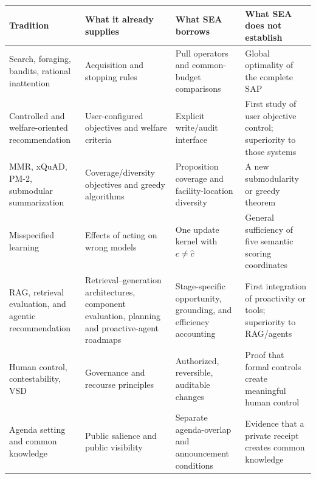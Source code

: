 \documentclass[
  11pt]{article}
\begin{document}
\begin{longtable}[]{@{}
  >{\raggedright\arraybackslash}p{}
  >{\raggedright\arraybackslash}p{}
  >{\raggedright\arraybackslash}p{}
  >{\raggedright\arraybackslash}p{}@{}}
\toprule\noalign{}
\begin{minipage}[b]{\linewidth}\raggedright
Tradition
\end{minipage} & \begin{minipage}[b]{\linewidth}\raggedright
What it already supplies
\end{minipage} & \begin{minipage}[b]{\linewidth}\raggedright
What SEA borrows
\end{minipage} & \begin{minipage}[b]{\linewidth}\raggedright
What SEA does not establish
\end{minipage} \\
\midrule\noalign{}
\endhead
\bottomrule\noalign{}
\endlastfoot
Search, foraging, bandits, rational inattention & Acquisition and
stopping rules & Pull operators and common-budget comparisons & Global
optimality of the complete SAP \\
Controlled and welfare-oriented recommendation & User-configured
objectives and welfare criteria & Explicit write/audit interface & First
study of user objective control; superiority to those systems \\
MMR, xQuAD, PM-2, submodular summarization & Coverage/diversity
objectives and greedy algorithms & Proposition coverage and
facility-location diversity & A new submodularity or greedy theorem \\
Misspecified learning & Effects of acting on wrong models & One update
kernel with \(c\ne\hat c\) & General sufficiency of five semantic
scoring coordinates \\
RAG, retrieval evaluation, and agentic recommendation &
Retrieval--generation architectures, component evaluation, planning and
proactive-agent roadmaps & Stage-specific opportunity, grounding, and
efficiency accounting & First integration of proactivity or tools;
superiority to RAG/agents \\
Human control, contestability, VSD & Governance and recourse principles
& Authorized, reversible, auditable changes & Proof that formal controls
create meaningful human control \\
Agenda setting and common knowledge & Public salience and public
visibility & Separate agenda-overlap and announcement conditions &
Evidence that a private receipt creates common knowledge \\
\end{longtable}
\end{document}
